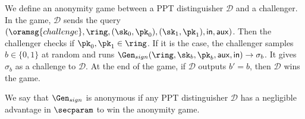 	\begin{definition}\label{def:anonymity}
		We define an anonymity game between a PPT distinguisher $ \mathcal{D} $ and a challenger.
		In the game, $\mathcal{D}$ sends the query  $ (\oramsg{challenge}, \ring, (\sk_0,\pk_0), (\sk_1, \pk_1), \msg,\aux)$. Then the challenger checks if  $ \pk_0, \pk_1 \in \ring $. If it is the case, the challenger  samples $ b\in \{0,1\}  $ at random and runs $ \Gen_{sign}(\ring, \sk_b, \pk_b,\aux, \msg) \rightarrow \sigma_b $. It gives $ \sigma_b $ as a challenge to $ \mathcal{D} $. At the end of the game, if $ \mathcal{D} $ outputs $ b' = b $, then $\mathcal{D}$ wins the game.
			
		We say that $ \Gen_{sign} $ is anonymous  if any PPT distinguisher $ \mathcal{D} $ has a negligible advantage in $ \secparam $ to win the anonymity game.
	\end{definition}
	
	
	
	
